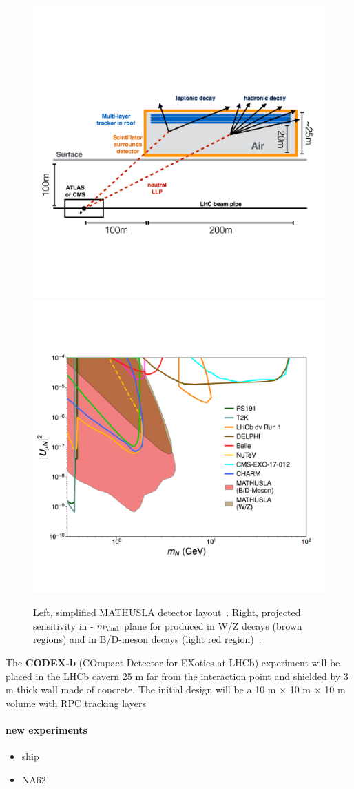 \begin{figure}[h!]
\centering
    \includegraphics[clip,trim=0.3cm 0cm 1.cm 2cm, width=.45\textwidth]{Figures/c7/mathusla1.pdf}
    \includegraphics[clip,trim=0cm 2cm 0.5cm 3cm, width=.54\textwidth]{Figures/c7/mathusla2.pdf}
\caption{Left, simplified MATHUSLA detector
  layout~\cite{Alimena_2020}. Right, projected sensitivity in \mixparm
  - $m_\hnl$ plane for \hnl produced in W/Z decays (brown regions) and in B/D-meson decays (light red region)~\cite{Curtin_2019}.
}
\label{fig:mathu2}
\end{figure}

The \textbf{CODEX-b} (COmpact Detector for EXotics at LHCb) experiment
will be placed in the LHCb cavern 25 m far from the interaction point
and shielded by 3 m thick wall made of concrete. The initial design
will be a 10 m $\times$ 10 m
$\times$ 10 m volume with RPC tracking layers





\paragraph{new experiments}
\begin{itemize}
\item ship
\item NA62
\end{itemize}


